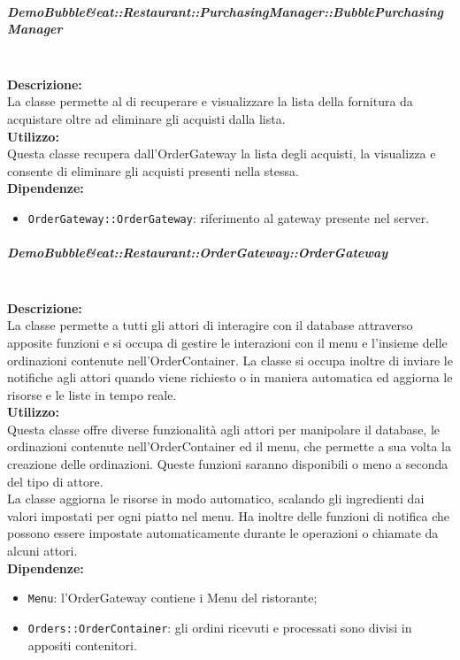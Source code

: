 \subparagraph{Demo\-Bubble\&eat\-::Restaurant\-::PurchasingManager\-::Bub\-ble\-Purcha\-sing\-Ma\-nager}\label{eat-purchasing}\mbox{}\\
\textbf{Descrizione:}\\
La classe permette al \Purchasingmanager{} di recuperare e visualizzare la lista della fornitura da acquistare oltre ad eliminare gli acquisti dalla lista.\\
\textbf{Utilizzo:}\\
Questa classe recupera dall'Order\-Gateway la lista degli acquisti, la visualizza e consente di eliminare gli acquisti presenti nella stessa.\\
\textbf{Dipendenze:}
\begin{itemize}
	\item \texttt{OrderGateway::OrderGateway}: riferimento al gateway presente nel server.
\end{itemize}

\subparagraph{Demo\-Bubble\&eat\-::Restaurant\-::Order\-Gateway\-::Order\-Ga\-te\-way}\label{eat-gateway}\mbox{}\\
\textbf{Descrizione:}\\
La classe permette a tutti gli attori di interagire con il database attraverso apposite funzioni e si occupa di gestire le interazioni con il menu e l'insieme delle ordinazioni contenute nell'OrderContainer. La classe si occupa inoltre di inviare le notifiche agli attori quando viene richiesto o in maniera automatica ed aggiorna le risorse e le liste in tempo reale.\\
\textbf{Utilizzo:}\\
Questa classe offre diverse funzionalità agli attori per manipolare il database, le ordinazioni contenute nell'OrderContainer ed il menu, che permette a sua volta la creazione delle ordinazioni. Queste funzioni saranno disponibili o meno a seconda del tipo di attore.\\
La classe aggiorna le risorse in modo automatico, scalando gli ingredienti dai valori impostati per ogni piatto nel menu. Ha inoltre delle funzioni di notifica che possono essere impostate automaticamente durante le operazioni o chiamate da alcuni attori.\\
\textbf{Dipendenze:}
\begin{itemize}
	\item \texttt{Menu}: l'OrderGateway contiene i Menu del ristorante;
	\item \texttt{Orders::OrderContainer}: gli ordini ricevuti e processati sono divisi in appositi contenitori.
\end{itemize}

